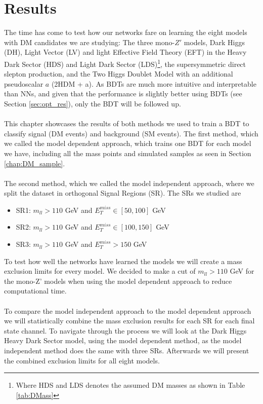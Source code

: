 \documentclass[12pt, a4paper]{book}
\begin{document}
\chapter{Results}\label{chap:results}
The time has come to test how our networks fare on learning the eight models with DM candidates we are studying: The three mono-$Z'$ models, Dark Higgs (DH), Light Vector (LV) and light Effective Field Theory (EFT) in the Heavy Dark Sector (HDS) and Light Dark Sector (LDS)\footnote{Where HDS and LDS denotes the assumed DM masses as shown in Table \ref{tab:DMass}}, 
the supersymmetric direct slepton production, and the Two Higgs Doublet Model with an additional pseudoscalar $a$ (2HDM + a). As BDTs are much more intuitive and interpretable than NNs, and given that the performance is slightly better using BDTs (see Section \ref{sec:opt_res}), only the BDT will be followed up. \\
\\This chapter showcases the results of both methods we used to train a BDT to classify signal (DM events) and background (SM events). The first method, which we called the model dependent approach, which trains one BDT for each model we have, including all the mass points and simulated samples as seen in Section \ref{chap:DM_sample}. \\
\\The second method, which we called the model independent approach, where we split the dataset in orthogonal Signal Regions (SR). The SRs we studied are
\begin{itemize}
   \item SR1: $m_{ll} >110$ GeV and $E_T^{miss} \in [50, 100]$ GeV
   \item SR2: $m_{ll} >110$ GeV and $E_T^{miss} \in [100, 150]$ GeV
   \item SR3: $m_{ll} >110$ GeV and $E_T^{miss} >150$ GeV
\end{itemize}
To test how well the networks have learned the models we will create a mass exclusion limits for every model. We decided to make a cut of $m_{ll} >110$ GeV for the mono-Z' models when using the model dependent approach to reduce computational time.\\
\\To compare the model independent approach to the model dependent approach we will statistically combine the mass exclusion results for each SR for each final state channel. To navigate through the process we will look at the Dark Higgs Heavy Dark Sector model, using the model dependent method, 
as the model independent method does the same with three SRs. Afterwards we will present the combined exclusion limits for all eight models.
\end{document}
